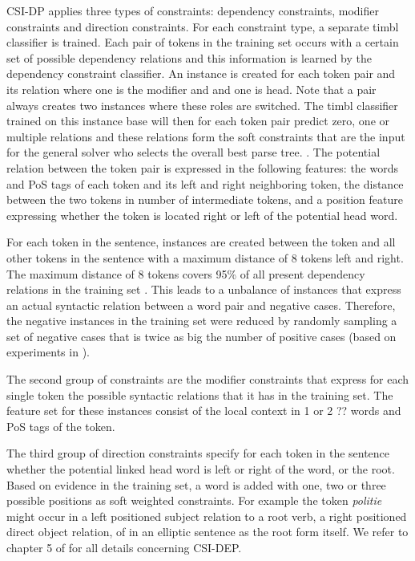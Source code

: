 \documentclass{book}
\begin{document}
CSI-DP applies three types of constraints: dependency constraints, modifier constraints and direction constraints. For each constraint type, a separate timbl classifier is trained. Each pair of tokens in the training set occurs with a certain set of possible dependency relations and this information is learned by the dependency constraint classifier. An instance is created for each token pair and its relation where one is the modifier and and one is head. Note that a pair always creates two instances where these roles are switched. The timbl classifier trained on this instance base will then for each token pair predict zero, one or multiple relations and these relations form the soft constraints that are the input for the general solver who selects the overall best parse tree.
.%
The potential relation between the token pair is expressed in the following features: the words and PoS tags of each token and its left and right neighboring token, the distance between the two tokens in number of intermediate tokens, and a position feature expressing whether the token is located right or left of the potential head word.

For each token in the sentence, instances are created between the token and all other tokens in the sentence with a maximum distance of 8 tokens left and right. The maximum distance of 8 tokens covers 95\% of all present dependency relations in the training set \cite{Canisius+2006}. This leads to a unbalance of instances that express an actual syntactic relation between a word pair and negative cases. Therefore, the negative instances in the training set were reduced by randomly sampling a set of negative cases that is twice as big the number of positive cases (based on experiments in \cite{Canisius2009}).

The second group of constraints are the modifier constraints that express for each single token the possible syntactic relations that it has in the training set. The feature set for these instances consist of the local context in 1 or 2 ?? words and PoS tags of the token.

The third group of direction constraints specify for each token in the sentence whether the potential linked head word is left or right of the word, or the root. Based on evidence in the training set, a word is added with one, two or three possible positions as soft weighted constraints. For example the token {\it politie} might occur in a left positioned subject relation to a root verb, a right positioned direct object relation, of in an elliptic sentence as the root form itself.
 We refer to chapter 5 of  for all details concerning CSI-DEP.
\end{document}
